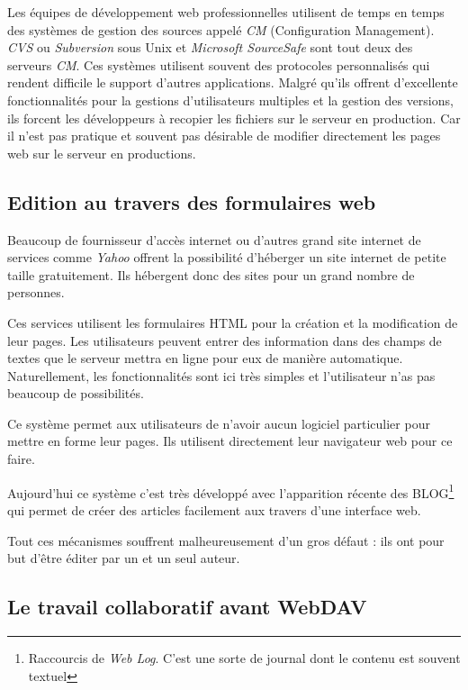\documentclass[a4paper, 11pt]{article}
\begin{document}
{		Les équipes de développement web professionnelles utilisent de temps en temps des systèmes de gestion des sources appelé \emph{CM} (Configuration Management). \emph{CVS} ou \emph{Subversion} sous Unix et \emph{Microsoft SourceSafe} sont tout deux des serveurs \emph{CM}. Ces systèmes utilisent souvent des protocoles personnalisés qui rendent difficile le support d'autres applications. Malgré qu'ils offrent d'excellente fonctionnalités pour la gestions d'utilisateurs multiples et la gestion des versions, ils forcent les développeurs à recopier les fichiers sur le serveur en production. Car il n'est pas pratique et souvent pas désirable de modifier directement les pages web sur le serveur en productions. 
	
	\subsection{Edition au travers des formulaires web}
	
		Beaucoup de fournisseur d'accès internet ou d'autres grand site internet de services comme \emph{Yahoo} offrent la possibilité d'héberger un site internet de petite taille gratuitement. Ils hébergent donc des sites pour un grand nombre de personnes. 
		
		Ces services utilisent les formulaires HTML pour la création et la modification de leur pages. Les utilisateurs peuvent entrer des information dans des champs de textes que le serveur mettra en ligne pour eux de manière automatique. Naturellement, les fonctionnalités sont ici très simples et l'utilisateur n'as pas beaucoup de possibilités. 
		
		Ce système permet aux utilisateurs de n'avoir aucun logiciel particulier pour mettre en forme leur pages. Ils utilisent directement leur navigateur web pour ce faire. 
		
		Aujourd'hui ce système c'est très développé avec l'apparition récente des BLOG\footnote{Raccourcis de \emph{Web Log}. C'est une sorte de journal dont le contenu est souvent textuel} qui permet de créer des articles facilement aux travers d'une interface web.
		
		Tout ces mécanismes souffrent malheureusement d'un gros défaut : ils ont pour but d'être éditer par un et un seul auteur. 

	\subsection{Le travail collaboratif avant WebDAV}

}
\end{document}
